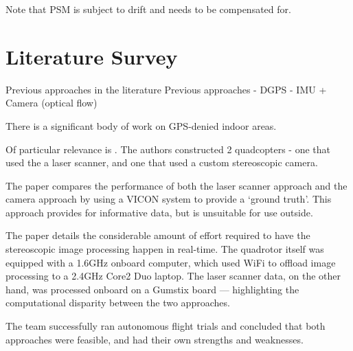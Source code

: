 \documentclass[12pt,oneside,a4paper]{book}
\begin{document}
Note  that PSM is subject to
drift and needs to be compensated for.

\section{Literature Survey}
\label{sec:litsurvey}

Previous approaches in the literature
Previous approaches
- DGPS
- IMU + Camera (optical flow)


There is a significant body of work on GPS-denied indoor areas.

Of particular relevance is \cite{achtelik2009stereo}. The authors
constructed 2 quadcopters - one that used the a laser scanner, and one
that used a custom stereoscopic camera. 

The paper compares the performance of both the laser scanner
approach and the camera approach by using a VICON system to provide a
`ground truth'. This approach provides for informative data, but is
unsuitable for use outside.

The paper details the considerable amount of effort required to have
the stereoscopic image processing happen in real-time. The quadrotor
itself was equipped with a 1.6GHz onboard computer, which used WiFi to
offload image processing to a 2.4GHz Core2 Duo laptop. The laser
scanner data, on the other hand, was processed onboard on a Gumstix
board --- highlighting the computational disparity between the two
approaches.


The team successfully ran autonomous flight trials and concluded that
both approaches were feasible, and had their own strengths and
weaknesses.

\end{document}

